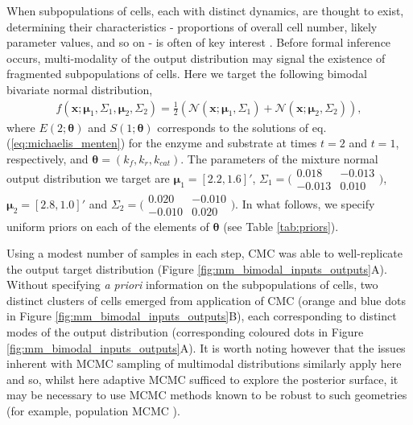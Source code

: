 \documentclass[10pt,letterpaper]{article}
\begin{document}
When subpopulations of cells, each with distinct dynamics, are thought to exist, determining their characteristics - proportions of overall cell number, likely parameter values, and so on - is often of key interest \cite{hasenauer2011identification,loos2018hierarchical}. Before formal inference occurs, multi-modality of the output distribution may signal the existence of fragmented subpopulations of cells. Here we target the following bimodal bivariate normal distribution,
%
\begin{align}
f(\boldsymbol{x}; \boldsymbol{\mu}_1,\Sigma_1, \boldsymbol{\mu}_2, \Sigma_2) = \frac{1}{2}\left(\mathcal{N}(\boldsymbol{x}; \boldsymbol{\mu}_1,\Sigma_1) + \mathcal{N}(\boldsymbol{x}; \boldsymbol{\mu}_2,\Sigma_2)\right),
\end{align}
%
where $E(2; \boldsymbol{\theta})$ and $S(1; \boldsymbol{\theta})$ corresponds to the solutions of eq. (\ref{eq:michaelis_menten}) for the enzyme and substrate at times $t=2$ and $t=1$, respectively, and $\boldsymbol{\theta}=(k_f,k_r,k_{cat})$. The parameters of the mixture normal output distribution we target are $\boldsymbol{\mu}_1=[2.2, 1.6]'$, $\Sigma_1 = \bigl( \begin{smallmatrix}0.018 & -0.013\\ -0.013 & 0.010\end{smallmatrix}\bigr)$, $\boldsymbol{\mu}_2=[2.8, 1.0]'$ and $\Sigma_2=( \begin{smallmatrix}0.020 & -0.010\\ -0.010 & 0.020\end{smallmatrix}\bigr)$. In what follows, we specify uniform priors on each of the elements of $\boldsymbol{\theta}$ (see Table \ref{tab:priors}).


Using a modest number of samples in each step, CMC was able to well-replicate the output target distribution (Figure \ref{fig:mm_bimodal_inputs_outputs}A). Without specifying \textit{a priori} information on the subpopulations of cells, two distinct clusters of cells emerged from application of CMC (orange and blue dots in Figure \ref{fig:mm_bimodal_inputs_outputs}B), each corresponding to distinct modes of the output distribution (corresponding coloured dots in Figure \ref{fig:mm_bimodal_inputs_outputs}A). It is worth noting however that the issues inherent with MCMC sampling of multimodal distributions similarly apply here and so, whilst here adaptive MCMC \cite{johnstone2016uncertainty} sufficed to explore the posterior surface, it may be necessary to use MCMC methods known to be robust to such geometries (for example, population MCMC \cite{jasra2007population}). 
\end{document}
